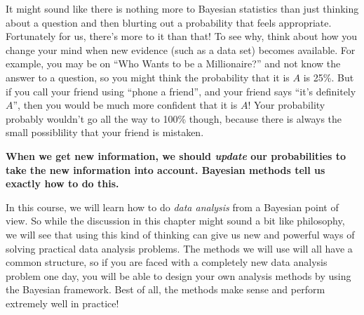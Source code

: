 It might sound like there is nothing more to Bayesian statistics than just
thinking about a question and then blurting out a probability that feels
appropriate. Fortunately for us, there's more to it than that! To see why, think
about how you change your mind when new evidence (such as a data set) becomes
available. For example, you may be on ``Who Wants to be a Millionaire?'' and
not know the answer to a question, so you might think the probability that it is
$A$ is 25\%. But if you call your friend using ``phone a friend'', and
your friend says 
``it's definitely $A$'', then you would be much more confident that it is $A$!
Your probability probably wouldn't go all the way to 100\% though, because there
is always the small possiblility that your friend is mistaken.

\begin{framed}
{\bf When we get new information, we should {\it update} our probabilities to
take the new information into account. Bayesian methods tell us exactly how to
do this.}
\end{framed}

In this course, we will learn how to do {\it data analysis} from a Bayesian
point of view. So while the discussion in this chapter might sound a bit
like philosophy, we will see that using this kind of thinking can give us
new and powerful ways of solving practical data analysis problems. The methods we will use
will all have a common structure, so if you are faced with a completely new
data analysis problem one day, you will be able to design your own analysis
methods by using the Bayesian framework. Best of all, the methods make sense
and perform extremely well in practice!


